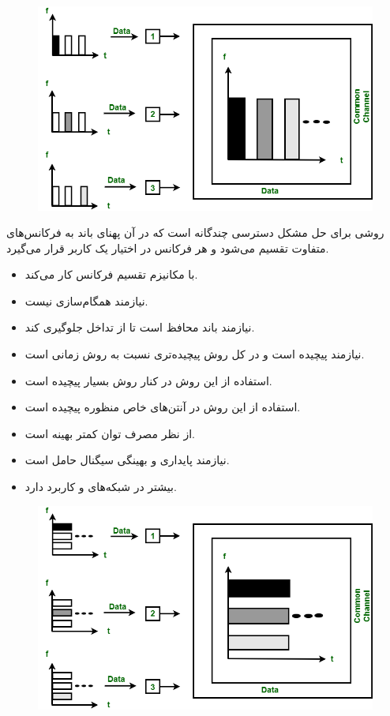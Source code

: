 {\begin{figure}[H]
    \includegraphics[width=12cm]{Images/TDMA.png}
    \centering
    \caption{}
\end{figure}

روشی برای حل مشکل دسترسی چندگانه است که در آن پهنای باند به فرکانس‌های متفاوت تقسیم می‌شود و هر فرکانس در اختیار یک کاربر قرار می‌گیرد.

\begin{itemize}
    \item
    با مکانیزم تقسیم فرکانس کار می‌کند.
    
    \item
    نیازمند همگام‌سازی نیست.
    
    \item
    نیازمند باند محافظ
    است تا از تداخل جلوگیری کند.
    
    \item
    نیازمند
    پیچیده است و در کل روش پیچیده‌تری نسبت به روش زمانی است.

    \item
    استفاده از این روش در کنار روش
    بسیار پیچیده است.
    
    \item
    استفاده از این روش در آنتن‌های خاص منظوره پیچیده است.
    
    \item
    از نظر مصرف توان کمتر بهینه است.
    
    \item
    نیازمند پایداری و بهینگی سیگنال حامل است.
    
    \item
    بیشتر در شبکه‌های
    و
    کاربرد دارد.
\end{itemize}

\begin{figure}[H]
    \includegraphics[width=12cm]{Images/FDMA.png}
    \centering
    \caption{}
\end{figure}
}